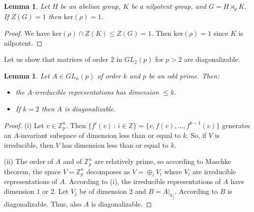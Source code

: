 \documentclass[a4paper, english, 9pt]{amsart}
\theoremstyle{plain}
\newtheorem{corollary}[theorem]{Corollary}
\newtheorem{lemma}[theorem]{Lemma}
\theoremstyle{definition}
\def\ker#1{\mathrm{ker}(#1)}
\def\setof#1#2{\{#1\,\colon\,#2\}}
\def\Z{\mathbb Z}
\begin{document}
\begin{lemma}\label{no center}
    Let $H$ be an abelian group, $K$ be a nilpotent group, and $G=H\rtimes_{\rho} K$. If $Z(G)=1$ then $\ker{\rho}=1$.
\end{lemma}

\begin{proof}




We have $\ker{\rho}\cap Z(K)\leq Z(G)=1$. Then $\ker{\rho}=1$ since $K$ is nilpotent.
\end{proof}



Let us show that matrices of order $2$ in $GL_2(p)$ for $p>2$ are diagonalizable.

\begin{lemma}\label{diag nxn}
    Let $A\in GL_n(p)$ of order $k$ and $p$ be an odd prime. Then: 
    
    \begin{itemize}
        \item[(i)] the $A$-irreducible representations has dimension $\leq k$.

 \item[(ii)]    If $k=2$ then $A$ is diagonalizable.
    \end{itemize}
\end{lemma}
\begin{proof}

(i)    Let $v\in \Z_p^n$. Then $\setof{f^i(v)}{i\in \mathbb{Z}}=\{v, f(v),\ldots,f^{k-1}(v)\}$ generates an $A$-invariant subspace of dimension less than or equal to $k$. So, if $V$ is irreducible, then $V$ has dimension less than or equal to $k$.  

    
(ii) The order of $A$ and of $\Z_p^n$ are relatively prime, so according to Maschke theorem, the space $V=\Z_p^n$ decomposes as $V=\oplus_i V_i$ where $V_i$ are irreducible representations of $A$. According to (i), the irreducible representations of $A$ have dimension $1$ or $2$. Let $V_j$ be of dimension $2$ and $B=A|_{V_j}$. According to \cite[Lemma 7.1]{LSS} $B$ is diagonalizable. Thus, also $A$ is diagonalizable.
%
\end{proof}
\end{document}
